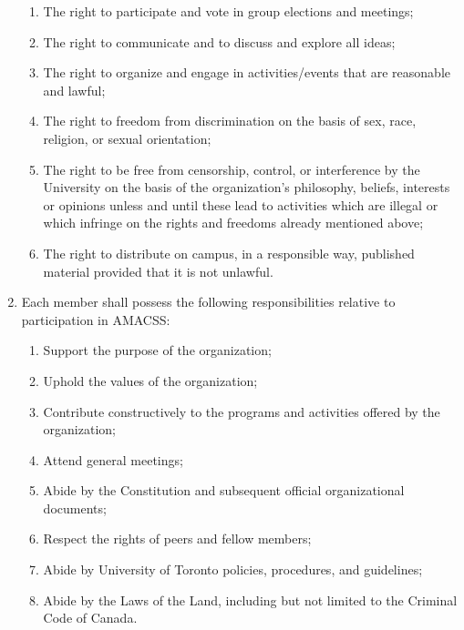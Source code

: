 \documentclass[12pt,a4paper]{article}
\begin{document}
\begin{enumerate}
\begin{enumerate}
\item The right to participate and vote in group elections and meetings;

\item The right to communicate and to discuss and explore all ideas;

\item The right to organize and engage in activities/events that are reasonable and lawful;

\item The right to freedom from discrimination on the basis of sex, race, religion, or sexual orientation;

\item The right to be free from censorship, control, or interference by the University on the basis of the organization's philosophy, beliefs, interests or opinions unless and until these lead to activities which are illegal or which infringe on the rights and freedoms already mentioned above;

\item The right to distribute on campus, in a responsible way, published material provided that it is not unlawful.
\end{enumerate}

\item Each member shall possess the following responsibilities relative to participation in AMACSS:

\begin{enumerate}
\item Support the purpose of the organization;

\item Uphold the values of the organization;
\item Contribute constructively to the programs and activities offered by the organization;

\item Attend general meetings;

\item Abide by the Constitution and subsequent official organizational documents;

\item Respect the rights of peers and fellow members;

\item Abide by University of Toronto policies, procedures, and guidelines;

\item Abide by the Laws of the Land, including but not limited to the Criminal Code of Canada.
\end{enumerate}


\end{enumerate}
\end{document}
